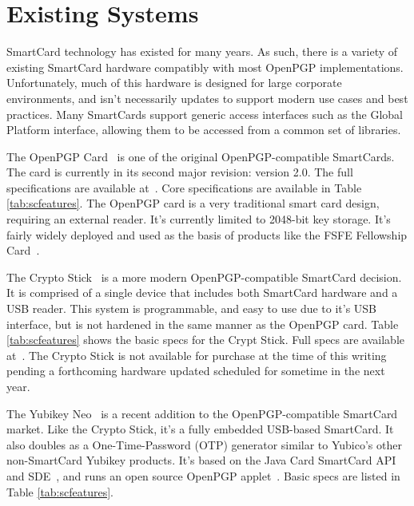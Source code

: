 \documentclass[11pt, twocolumn]{article}
\begin{document}
\section{Existing Systems}
\label{sec:exisitng}

SmartCard technology has existed for many years. As such, there is a
variety of existing SmartCard hardware compatibly with most OpenPGP
implementations. Unfortunately, much of this hardware is designed for
large corporate environments, and isn't necessarily updates to support
modern use cases and best practices. Many SmartCards support generic
access interfaces such as the Global Platform
interface\cite{globalplatform}, allowing them to be accessed from a
common set of libraries.

The OpenPGP Card~\cite{openpgpcard} is one of the original
OpenPGP-compatible SmartCards. The card is currently in its second
major revision: version 2.0. The full specifications are available
at~\cite{openpgpcard-doc-2.0}. Core specifications are available in
Table \ref{tab:scfeatures}. The OpenPGP card is a very traditional
smart card design, requiring an external reader. It's currently
limited to 2048-bit key storage. It's fairly widely deployed and used
as the basis of products like the FSFE Fellowship
Card~\cite{fellowshipcard}.

The Crypto Stick~\cite{cryptostick} is a more modern
OpenPGP-compatible SmartCard decision. It is comprised of a single
device that includes both SmartCard hardware and a USB reader. This
system is programmable, and easy to use due to it's USB interface, but
is not hardened in the same manner as the OpenPGP card. Table
\ref{tab:scfeatures} shows the basic specs for the Crypt Stick. Full
specs are available at~\cite{cryptostick-wiki}. The Crypto Stick is
not available for purchase at the time of this writing pending a
forthcoming hardware updated scheduled for sometime in the next year.

The Yubikey Neo~\cite{yubikeyneo-openpgp-blog} is a recent addition to
the OpenPGP-compatible SmartCard market. Like the Crypto Stick, it's a
fully embedded USB-based SmartCard. It also doubles as a
One-Time-Password (OTP) generator similar to Yubico's other
non-SmartCard Yubikey products. It's based on the Java Card SmartCard
API and SDE~\cite{javacard}, and runs an open source OpenPGP
applet~\cite{yubikeyneo-openpgp-repo}. Basic specs are listed in Table
\ref{tab:scfeatures}.
\end{document}
